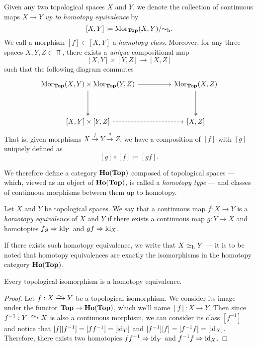 Given any two topological spaces \(X\) and \(Y\), we denote the
collection of continuous maps \(X \to Y\) \emph{up to homotopy equivalence} by
\[
[X, Y] \coloneq \operatorname{Mor}_{{\textbf{Top}}}(X, Y)/{\sim_{\text{h}}}.
\]
We call a morphism \([f] \in [X, Y]\) a \emph{homotopy class}. Moreover, for any
three spaces \(X, Y, Z \in \Top\), there exists a \emph{unique} compositional
map
\[
[X, Y] \times [Y, Z] \to [X, Z]
\]
such that the following diagram commutes
\[
\begin{tikzcd}
\Hom_{\Top}(X, Y) \times \Hom_{\Top}(Y, Z)
\ar[rr] \ar[dd, two heads]
&&\Hom_{\Top}(X, Z) \ar[dd, two heads]
\\ && \\
{[X, Y] \times [Y, Z]} \ar[rr, dashed]
&& {[X, Z]}
\end{tikzcd}
\]
That is, given morphisms \(X \xrightarrow{f} Y \xrightarrow{g} Z\), we have a
composition of \([f]\) with \([g]\) uniquely defined as
\[
[g] \circ [f] \coloneq [g f].
\]

\begin{definition}
\label{def:Ho(Top)}
We therefore define a category \({\textbf{Ho}(\textbf{Top})}\) composed of topological spaces ---
which, viewed as an object of \({\textbf{Ho}(\textbf{Top})}\), is called a \emph{homotopy type} ---
and classes of continuous morphisms between them up to homotopy.
\end{definition}

\begin{definition}
\label{def:homotopy-equivalence}
Let \(X\) and \(Y\) be topological spaces. We say that a continuous map
\(f: X \to Y\) is a \emph{homotopy equivalence} of \(X\) and \(Y\) if there
exists a continuous map \(g: Y \to X\) and homotopies \(f g \Rightarrow \operatorname{id}_Y\) and
\(g f \Rightarrow \operatorname{id}_X\).

If there exists such homotopy equivalence, we write that \(X \simeq_{\text{h}} Y\) --- it
is to be noted that homotopy equivalences are exactly the isomorphisms in the
homotopy category \({\textbf{Ho}(\textbf{Top})}\).
\end{definition}

\begin{corollary}
\label{cor:homeomorphism-is-homotopy-equivalence}
Every topological isomorphism is a homotopy equivalence.
\end{corollary}

\begin{proof}
Let \(f: X \isoto Y\) be a topological isomorphism. We consider its image
under the functor \({\textbf{Top}} \to {\textbf{Ho}(\textbf{Top})}\), which we'll name \([f]: X \to Y\). Then
since \(f^{-1}: Y \isoto X\) is also a continuous morphism, we can consider its
class \([f^{-1}]\) and notice that \([f] [f^{-1}] = [f f^{-1}] = [\operatorname{id}_Y]\) and
\([f^{-1}] [f] = [f^{-1} f] = [\operatorname{id}_X]\). Therefore, there exists two homotopies
\(f f^{-1} \Rightarrow \operatorname{id}_Y\) and \(f^{-1} f \Rightarrow \operatorname{id}_X\).
\end{proof}

